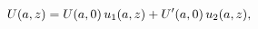 \[\mathop{U\/}\nolimits\!\left(a,z\right)=\mathop{U\/}\nolimits\!\left(a,0\right%
)u_{1}(a,z)+\mathop{U\/}\nolimits'\!\left(a,0\right)u_{2}(a,z),\]